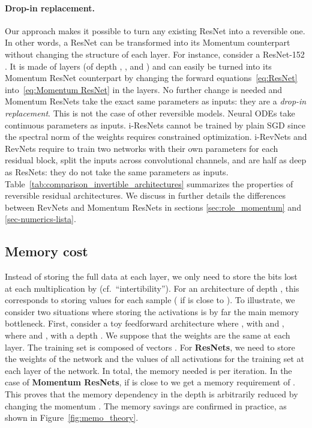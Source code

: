 \documentclass{article}
\begin{document}
\paragraph{Drop-in replacement.}
Our approach makes it possible to turn any existing ResNet into a reversible one.  In other words, a ResNet can be transformed into its Momentum counterpart without changing the structure of each layer. For instance, consider a ResNet-152 \citep{he2015deep}. It is made of  layers (of depth , ,  and ) and can easily be turned into its Momentum ResNet counterpart 
by changing the forward equations~\eqref{eq:ResNet} 
into~\eqref{eq:Momentum ResNet} in the  layers. No further change is needed and Momentum ResNets take the exact same parameters as inputs: they are a \textit{drop-in replacement}. This is not the case of other reversible models. Neural ODEs \citep{chen2018neural} take continuous parameters as inputs. i-ResNets \citep{behrmann2019invertible} cannot be trained by plain SGD since the spectral norm of the weights requires constrained optimization. i-RevNets \citep{jacobsen2018irevnet} and RevNets \citep{gomez2017reversible} require to train two networks with their own parameters for each residual block, split the inputs across convolutional channels, and are half as deep as ResNets: they do not take the same parameters as inputs. Table~\ref{tab:comparison_invertible_architectures} summarizes the properties of reversible residual architectures.  We discuss in further details the differences between RevNets and Momentum ResNets in sections \ref{sec:role_momentum} and \ref{sec-numerics-lista}.


\subsection{Memory cost}\label{section:memory_cost}

Instead of storing the full data at each layer, we only need to store the bits lost at each multiplication by  (cf.\ ``intertibility''). For an architecture of depth , this corresponds to storing  values for each sample ( if  is close to ).
To illustrate, we consider two situations where storing the activations is by far the main memory bottleneck. First, consider a toy feedforward architecture where , with  and , where  and , with a depth . We suppose that the weights are the same at each layer.
The training set is composed of  vectors . 
For \textbf{ResNets}, we need to store the weights of the network and the values of all activations for the training set at each layer of the network.
In total, the memory needed is  per iteration. 
In the case of \textbf{Momentum ResNets}, if  is close to  we get a memory requirement of .
This proves that the memory dependency in the depth  is arbitrarily reduced by changing the momentum . The memory savings are confirmed in practice, as shown in Figure~\ref{fig:memo_theory}. 
\end{document}
